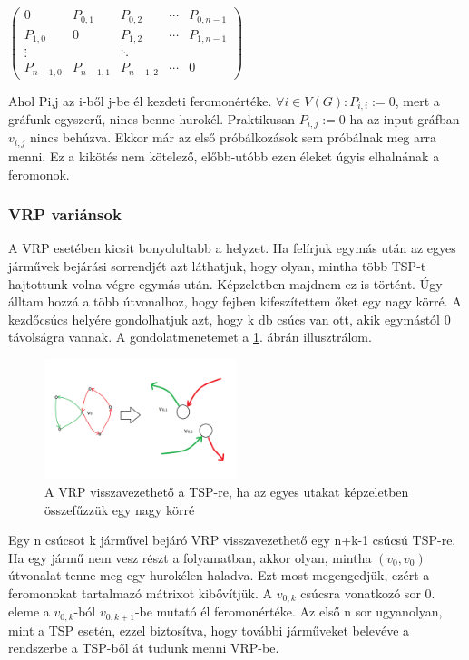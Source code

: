 $\begin{pmatrix}
	0 & P_{0,1} & P_{0,2} & \cdots & P_{0,n-1}\\ 
	P_{1,0} & 0 & P_{1,2} & \cdots & P_{1,n-1} \\
	\vdots & & \ddots \\
	P_{n-1,0} & P_{n-1,1} & P_{n-1,2} & \cdots & 0
\end{pmatrix}$

Ahol P{\scriptsize i,j} az i-ből j-be él kezdeti feromonértéke. \( \forall i\in V(G) : P_{i,i}:=0 \), mert a gráfunk egyszerű, nincs benne hurokél. Praktikusan \( P_{i,j}:=0 \) ha az input gráfban \(v_{i,j}\) nincs behúzva. Ekkor már az első próbálkozások sem próbálnak meg arra menni. Ez a kikötés nem kötelező, előbb-utóbb ezen éleket úgyis elhalnának a feromonok. 

\subsubsection{VRP variánsok} \label{VRPvariants_subsection}
A VRP esetében kicsit bonyolultabb a helyzet. Ha felírjuk egymás után az egyes járművek bejárási sorrendjét azt láthatjuk, hogy olyan, mintha több TSP-t hajtottunk volna végre egymás után. Képzeletben majdnem ez is történt. Úgy álltam hozzá a több útvonalhoz, hogy fejben kifeszítettem őket egy nagy körré. A kezdőcsúcs helyére gondolhatjuk azt, hogy k db csúcs van ott, akik egymástól 0 távolságra vannak. A gondolatmenetemet a \ref{tsp-to-vrp}. ábrán illusztrálom. 

\begin{figure}[ht!]
	\centering
	\includegraphics[width=0.5\textwidth]{figures/tsp-to-vrp.png}
	\caption{A VRP visszavezethető a TSP-re, ha az egyes utakat képzeletben összefűzzük egy nagy körré \label{tsp-to-vrp} }
\end{figure}

Egy n csúcsot k járművel bejáró VRP visszavezethető egy n+k-1 csúcsú TSP-re. Ha egy jármű nem vesz részt a folyamatban, akkor olyan, mintha \( (v_0,v_0) \) útvonalat tenne meg egy hurokélen haladva. Ezt most megengedjük, ezért a feromonokat tartalmazó mátrixot kibővítjük. A \(v_{0,k} \) csúcsra vonatkozó sor 0. eleme a \( v_{0,k}\)-ból \(v_{0,k+1}\)-be mutató él feromonértéke. Az első n sor ugyanolyan, mint a TSP esetén, ezzel biztosítva, hogy további járműveket belevéve a rendszerbe a TSP-ből át tudunk menni VRP-be.

